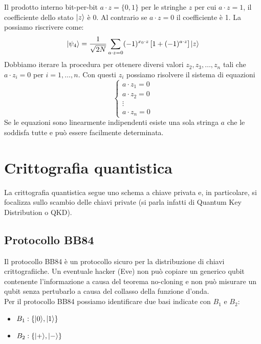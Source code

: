 \documentclass[12pt, a4paper]{report}
\begin{document}
Il prodotto interno bit-per-bit $a\cdot z = \{0,1\}$ per le stringhe $z$ per cui $a\cdot z=1$, il coefficiente dello stato $| z \rangle$ è 0. Al contrario se $a\cdot z=0$ il coefficiente è 1. La possiamo riscrivere come:
\begin{equation*}
    | \psi_{4} \rangle = \frac{1}{\sqrt{2N}} \sum_{a\cdot z=0} (-1)^{x_{0}\cdot z}\left[1+(-1)^{a\cdot z}\right]| z \rangle
\end{equation*}
Dobbiamo iterare la procedura per ottenere diversi valori $z_{2},z_{3},\ldots,z_{n}$ tali che $a\cdot z_{i}=0$ per $i=1,\ldots,n$. Con questi $z_{i}$ possiamo risolvere il sistema di equazioni
\begin{equation*}
    \begin{cases}
        a\cdot z_{1} = 0 \\
        a\cdot z_{2} = 0 \\
        \vdots \\
        a\cdot z_{n} = 0
    \end{cases}
\end{equation*}
Se le equazioni sono linearmente indipendenti esiste una sola stringa $a$ che le soddisfa tutte e può essere facilmente determinata.
\chapter{Crittografia quantistica}
La crittografia quantistica segue uno schema a chiave privata e, in  particolare, si focalizza sullo scambio delle chiavi private (si parla infatti di Quantum Key Distribution o QKD).
\section{Protocollo BB84}
Il protocollo BB84 è un protocollo sicuro per la distribuzione di chiavi crittografiiche. Un eventuale hacker (Eve) non può copiare un generico qubit contenente l'informazione a causa del teorema no-cloning e non può misurare un qubit senza pertubarlo a causa del collasso della funzione d'onda.\\
Per il protocollo  BB84 possiamo identificare due basi indicate con $B_{1}$ e $B_{2}$:
\begin{itemize}
    \item $B_{1}:\{| 0 \rangle,| 1 \rangle\}$
    \item $B_{2}: \{| + \rangle,| - \rangle\}$
\end{itemize}
\end{document}
